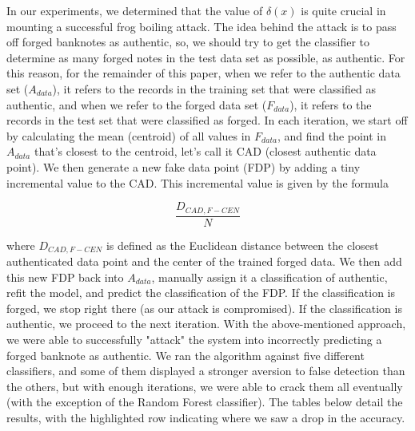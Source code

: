\documentclass{article}
\begin{document}
In our experiments, we determined that the value of $\delta(x)$ is quite crucial in mounting a successful frog boiling attack. The idea behind the attack is to pass off forged banknotes as authentic, so, we should try to get the classifier to determine as many forged notes in the test data set as possible, as authentic. For this reason, for the remainder of this paper, when we refer to the authentic data set ($A_{data}$), it refers to the records in the training set that were classified as authentic, and when we refer to the forged data set ($F_{data}$), it refers to the records in the test set that were classified as forged.
\newline\newline
In each iteration, we start off by calculating the mean (centroid) of all values in $F_{data}$, and find the point in $A_{data}$ that's closest to the centroid, let's call it CAD (closest authentic data point). We then generate a new fake data point (FDP) by adding a tiny incremental value to the CAD. This incremental value is given by the formula

\begin{equation}
\frac{D_{CAD,F-CEN}}{N}
\end{equation}

where $D_{CAD,F-CEN}$ is defined as the Euclidean distance between the closest authenticated data point and the center of the trained forged data.
\newline\newline
We then add this new FDP back into $A_{data}$, manually assign it a classification of authentic, refit the model, and predict the classification of the FDP. If the classification is forged, we stop right there (as our attack is compromised). If the classification is authentic, we proceed to the next iteration.
\newline\newline
With the above-mentioned approach, we were able to successfully "attack" the system into incorrectly predicting a forged banknote as authentic. We ran the algorithm against five different classifiers, and some of them displayed a stronger aversion to false detection than the others, but with enough iterations, we were able to crack them all eventually (with the exception of the Random Forest classifier). The tables below detail the results, with the highlighted row indicating where we saw a drop in the accuracy.
\end{document}
